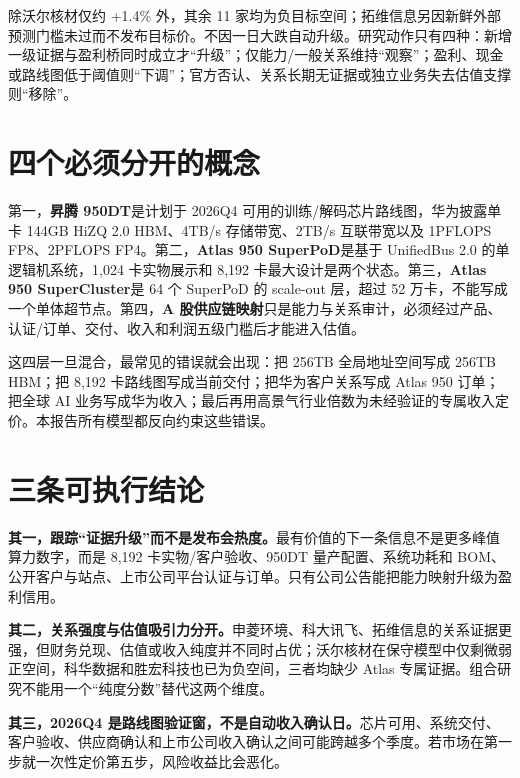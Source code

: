 除沃尔核材仅约 +1.4\% 外，其余 11 家均为负目标空间；拓维信息另因新鲜外部预测门槛未过而不发布目标价。不因一日大跌自动升级。研究动作只有四种：新增一级证据与盈利桥同时成立才“升级”；仅能力/一般关系维持“观察”；盈利、现金或路线图低于阈值则“下调”；官方否认、关系长期无证据或独立业务失去估值支撑则“移除”。

\section{四个必须分开的概念}

第一，\textbf{昇腾 950DT}是计划于 2026Q4 可用的训练/解码芯片路线图，华为披露单卡 144GB HiZQ 2.0 HBM、4TB/s 存储带宽、2TB/s 互联带宽以及 1PFLOPS FP8、2PFLOPS FP4。第二，\textbf{Atlas 950 SuperPoD}是基于 UnifiedBus 2.0 的单逻辑机系统，1,024 卡实物展示和 8,192 卡最大设计是两个状态。第三，\textbf{Atlas 950 SuperCluster}是 64 个 SuperPoD 的 scale-out 层，超过 52 万卡，不能写成一个单体超节点。第四，\textbf{A 股供应链映射}只是能力与关系审计，必须经过产品、认证/订单、交付、收入和利润五级门槛后才能进入估值。

这四层一旦混合，最常见的错误就会出现：把 256TB 全局地址空间写成 256TB HBM；把 8,192 卡路线图写成当前交付；把华为客户关系写成 Atlas 950 订单；把全球 AI 业务写成华为收入；最后再用高景气行业倍数为未经验证的专属收入定价。本报告所有模型都反向约束这些错误。

\section{三条可执行结论}

\textbf{其一，跟踪“证据升级”而不是发布会热度。}最有价值的下一条信息不是更多峰值算力数字，而是 8,192 卡实物/客户验收、950DT 量产配置、系统功耗和 BOM、公开客户与站点、上市公司平台认证与订单。只有公司公告能把能力映射升级为盈利信用。

\textbf{其二，关系强度与估值吸引力分开。}申菱环境、科大讯飞、拓维信息的关系证据更强，但财务兑现、估值或收入纯度并不同时占优；沃尔核材在保守模型中仅剩微弱正空间，科华数据和胜宏科技也已为负空间，三者均缺少 Atlas 专属证据。组合研究不能用一个“纯度分数”替代这两个维度。

\textbf{其三，2026Q4 是路线图验证窗，不是自动收入确认日。}芯片可用、系统交付、客户验收、供应商确认和上市公司收入确认之间可能跨越多个季度。若市场在第一步就一次性定价第五步，风险收益比会恶化。
